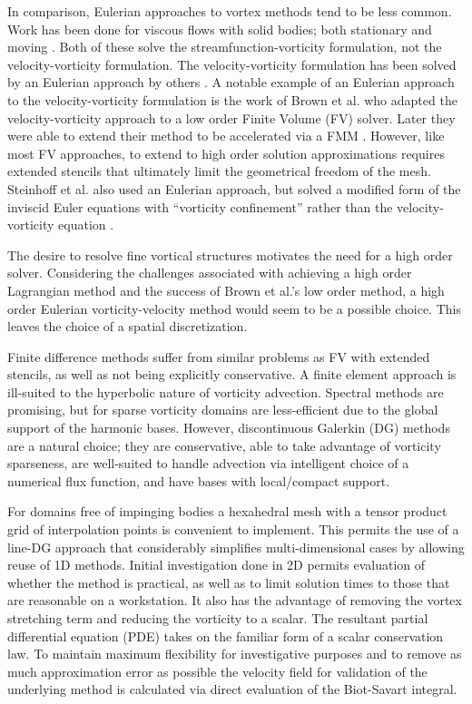 \documentclass[]{aiaa-tc}%
\begin{document}
In comparison, Eulerian approaches to vortex methods tend to be less common. Work has been done for viscous flows with solid bodies; both stationary \cite{MiscMeth3} and moving \cite{MiscMeth2}. Both of these solve the streamfunction-vorticity formulation, not the velocity-vorticity formulation. The velocity-vorticity formulation has been solved by an Eulerian approach by others \cite{MiscMeth4}. A notable example of an Eulerian approach to the velocity-vorticity formulation is the work of Brown et al. \cite{Brown2000} who adapted the velocity-vorticity approach to a low order Finite Volume (FV) solver. Later they were able to extend their method to be accelerated via a FMM \cite{Brown2004}. However, like most FV approaches, to extend to high order solution approximations requires extended stencils that ultimately limit the geometrical freedom of the mesh. Steinhoff et al. also used an Eulerian approach, but solved a modified form of the inviscid Euler equations with ``vorticity confinement'' rather than the velocity-vorticity equation \cite{SteinhoffUnderhill1994}.

The desire to resolve fine vortical structures motivates the need for a high order solver. Considering the challenges associated with achieving a high order Lagrangian method and the success of Brown et al.'s low order method, a high order Eulerian vorticity-velocity method would seem to be a possible choice. This leaves the choice of a spatial discretization.

Finite difference methods suffer from similar problems as FV with extended stencils, as well as not being explicitly conservative. A finite element approach is ill-suited to the hyperbolic nature of vorticity advection. Spectral methods are promising, but for sparse vorticity domains are less-efficient due to the global support of the harmonic bases. However, discontinuous Galerkin (DG) methods \cite{HestWar} are a natural choice; they are conservative, able to take advantage of vorticity sparseness, are well-suited to handle advection via intelligent choice of a numerical flux function, and have bases with local/compact support.

For domains free of impinging bodies a hexahedral mesh with a tensor product grid of interpolation points is convenient to implement. This permits the use of a line-DG \cite{Persson2013} approach that considerably simplifies multi-dimensional cases by allowing reuse of 1D methods. Initial investigation done in 2D permits evaluation of whether the method is practical, as well as to limit solution times to those that are reasonable on a workstation. It also has the advantage of removing the vortex stretching term and reducing the vorticity to a scalar. The resultant partial differential equation (PDE) takes on the familiar form of a scalar conservation law. To maintain maximum flexibility for investigative purposes and to remove as much approximation error as possible the velocity field for validation of the underlying method is calculated via direct evaluation of the Biot-Savart integral.
\end{document}
